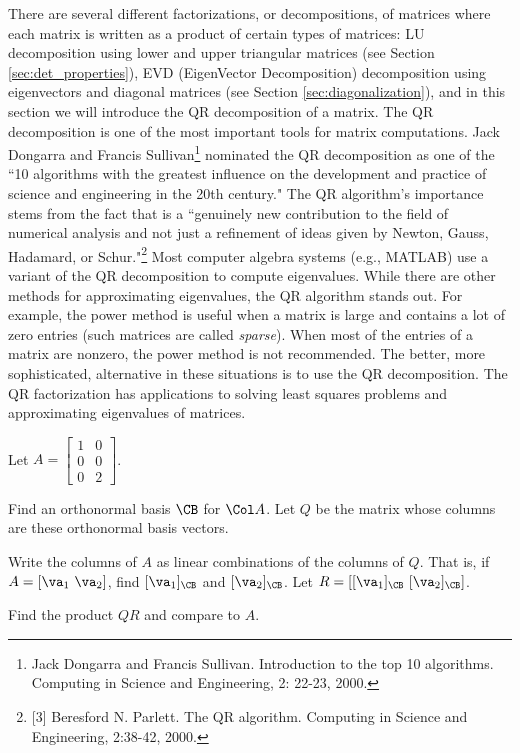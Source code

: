 \label{sec:qr_fact}

There are several different factorizations, or decompositions, of matrices where each matrix is written as a product of certain types of matrices: LU decomposition using lower and upper triangular matrices (see Section \ref{sec:det_properties}), EVD (EigenVector Decomposition) decomposition using eigenvectors and diagonal matrices (see Section \ref{sec:diagonalization}), and in this section we will introduce the QR decomposition of a matrix. The QR decomposition is one of the most important tools for matrix computations. Jack Dongarra and Francis Sullivan\footnote{Jack Dongarra and Francis Sullivan. Introduction to the top 10 algorithms. Computing in Science and Engineering, 2: 22-23, 2000.} nominated the QR decomposition as one of the ``10 algorithms with the greatest influence on the development and practice of science and engineering in the 20th century."  The QR algorithm's importance stems from the fact that is a ``genuinely new contribution to the field of numerical analysis and not just a refinement of ideas given by Newton, Gauss, Hadamard, or Schur."\footnote{[3] Beresford N. Parlett. The QR algorithm. Computing in Science and Engineering, 2:38-42, 2000.}  Most computer algebra systems (e.g., MATLAB) use a variant of the QR decomposition to compute eigenvalues. While there are other methods for approximating eigenvalues, the QR algorithm stands out. For example, the power method is useful when a matrix is large and contains a lot of zero entries (such matrices are called \emph{sparse}). When most of the entries of a matrix are nonzero, the power method is not recommended. The better, more sophisticated,  alternative in these situations is to use the QR decomposition. The QR factorization has applications to solving least squares problems and approximating eigenvalues of matrices.

\begin{activity} \label{act:6_e_QR} Let $A = \left[ \begin{array}{cc} 1&0 \\ 0&0 \\ 0&2 \end{array} \right]$.
	\ba
	\item Find an orthonormal basis $\CB$ for $\Col A$.  Let $Q$ be the matrix whose columns are these orthonormal basis vectors. 
		
	\item Write the columns of $A$ as linear combinations of the columns of $Q$. That is, if $A = [\va_1 \ \va_2]$, find $[\va_1]_{\CB}$ and $[\va_2]_{\CB}$. Let $R = [[\va_1]_{\CB} \ [\va_2]_{\CB}]$. 
	
	\item Find the product $QR$ and compare to $A$. 
	
	\ea
		
\end{activity}

